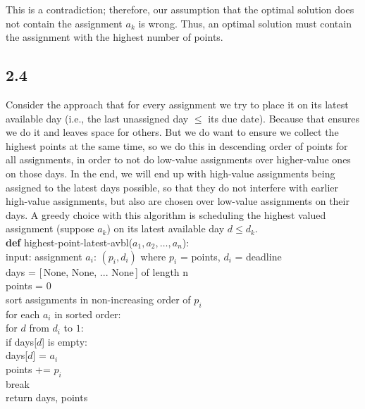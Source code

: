\documentclass{article}[12pt]
\begin{document}
This is a contradiction; therefore, our assumption that the optimal solution does not contain the assignment $a_k$ is wrong. Thus, an optimal solution must contain the assignment with the highest number of points.

\subsection*{2.4}
Consider the approach that for every assignment we try to place it on its latest available day (i.e., the last unassigned day $\le$ its due date). Because that ensures we do it and leaves space for others. But we do want to ensure we collect the highest points at the same time, so we do this in descending order of points for all assignments, in order to not do low-value assignments over higher-value ones on those days. In the end, we will end up with high-value assignments being assigned to the latest days possible, so that they do not interfere with earlier high-value assignments, but also are chosen over low-value assignments on their days. A greedy choice with this algorithm is scheduling the highest valued assignment (suppose $a_k$) on its latest available day $d\le d_k$. \\
\textbf{def} {highest-point-latest-avbl}($a_1, a_2, \dots, a_n$):\\
\hspace*{2em} input: assignment $a_i$: $(p_i, d_i)$ where $p_i$ = points, $d_i$ = deadline\\
\hspace*{2em} days = [\,None, None, ... None\,] of length n\\
\hspace*{2em} points = 0 \\
\hspace*{2em} sort assignments in non-increasing order of $p_i$\\
\hspace*{2em} for each $a_i$ in sorted order:\\
\hspace*{3em} for $d$ from $d_i$ to $1$:\\
\hspace*{4em} if days[$d$] is empty:\\
\hspace*{5em} days[$d$] = $a_i$\\
\hspace*{5em} points += $p_i$\\
\hspace*{5em} break\\
\hspace*{2em} return days, points
\end{document}
